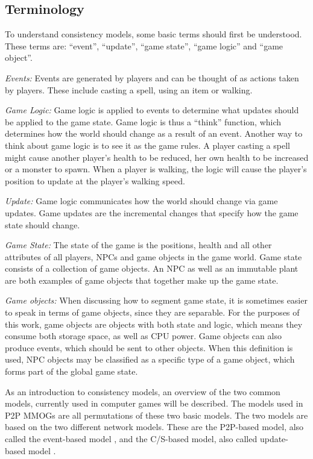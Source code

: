 \documentclass[10pt,a4paper,journal,cspaper,compsoc]{IEEEtran}
\begin{document}
\subsection{Terminology}
\label{terminology}

To understand consistency models, some basic terms should first be understood. These terms are: ``event'', ``update'', ``game state'', ``game logic''
and ``game object''.

\emph{Events:} Events are generated by players and can be thought of as actions taken by players. These include casting a spell, using an item
    or walking.

\emph{Game Logic:} Game logic is applied to events to determine what updates should be applied to the game state. Game logic is thus a
    ``think'' function, which determines how the world should change as a result of an event. Another way to think about game logic is to see
    it as the game rules. A player casting a spell might cause another player's health to be reduced, her own health to be increased or a
    monster to spawn. When a player is walking, the logic will cause the player's position to update at the player's walking speed.

\emph{Update:} Game logic communicates how the world should change via game updates. Game updates are the incremental changes that specify how
    the game state should change.

\emph{Game State:} The state of the game is the positions, health and all other attributes of all players, NPCs and game objects in the game
    world. Game state consists of a collection of game objects. An NPC as well as an immutable plant are both examples of game objects that
    together make up the game state.

\emph{Game objects:} When discussing how to segment game state, it is sometimes easier to speak in terms of game objects, since they are
    separable. For the purposes of this work, game objects are objects with both state and logic, which means they consume both storage
    space, as well as CPU power. Game objects can also produce events, which should be sent to other objects. When this definition is used,
    NPC objects may be classified as a specific type of a game object, which forms part of the global game state.

As an introduction to consistency models, an overview of the two common models, currently used in computer games will be described. The models used
in P2P MMOGs are all permutations of these two basic models. The two models are based on the two different network models. These are the P2P-based
model, also called the event-based model \cite{p2p_cm_aoe}, and the C/S-based model, also called update-based model \cite{unreal_networking}.
\end{document}
